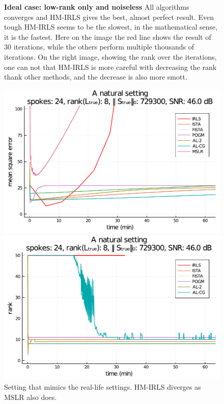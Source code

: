 \begin{figure}[p]
\begin{minipage}{0.48\linewidth}
    \end{minipage}
    \caption{\textbf{Ideal case: low-rank only and noiseless} All algorithms converges and HM-IRLS gives the best, almost perfect result. Even tough HM-IRLS seems to be the slowest, in the mathematical sense, it is the fastest. Here on the image the red line shows the result of 30 iterations, while the others perform multiple thousands of iterations. On the right image, showing the rank over the iterations, one can not that HM-IRLS is more careful with decreasing the rank thank other methods, and the decrease is also more smott.}
    \label{fig:ideal}
\end{figure}

\begin{figure}[p]
    \centering
    \begin{minipage}[t]{0.48\linewidth}
        \centering
        \includegraphics[width=\linewidth]{images/orig_MSE.pdf}
    \end{minipage}
    \begin{minipage}[t]{0.48\linewidth}
        \centering
        \includegraphics[width=\linewidth]{images/orig_rank.pdf}
    \end{minipage}
    \caption{{Setting that mimics the real-life settings.} HM-IRLS diverges as MSLR also does.}
    \label{fig:orig}
\end{figure}

